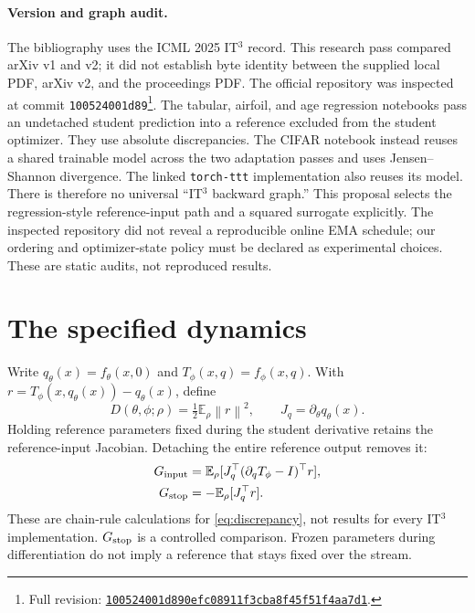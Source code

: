 \documentclass[11pt,a4paper]{article}
\newcommand{\E}{\mathbb{E}}
\newcommand{\norm}[1]{\left\lVert #1\right\rVert}
\begin{document}
\paragraph{Version and graph audit.}
The bibliography uses the ICML 2025 IT$^3$ record. This research pass compared
arXiv v1 and v2; it did not establish byte identity between the supplied
local PDF, arXiv v2, and the proceedings PDF. The official repository was
inspected at commit \texttt{100524001d89}\footnote{Full revision:
\href{https://github.com/nikitadurasov/ittt/tree/100524001d890efc08911f3cba8f45f51f4aa7d1}{\texttt{100524001d890efc08911f3cba8f45f51f4aa7d1}}.}.
The tabular, airfoil, and age regression notebooks pass an undetached student
prediction into a reference excluded from the student optimizer. They use
absolute discrepancies. The CIFAR notebook instead reuses a shared
trainable model across the two adaptation passes and uses Jensen--Shannon
divergence. The linked \texttt{torch-ttt} implementation also reuses its
model. There is therefore no universal ``IT$^3$ backward graph.'' This
proposal selects the regression-style reference-input path and a squared
surrogate explicitly. The inspected repository did not reveal a reproducible
online EMA schedule; our ordering and optimizer-state policy must be declared
as experimental choices. These are static audits, not reproduced results.

\section{The specified dynamics}
Write $q_\theta(x)=f_\theta(x,0)$ and $T_\phi(x,q)=f_\phi(x,q)$. With
$r=T_\phi(x,q_\theta(x))-q_\theta(x)$, define
\begin{equation}
 D(\theta,\phi;\rho)=\tfrac12\E_\rho\norm{r}^2,
 \qquad J_q=\partial_\theta q_\theta(x).
 \label{eq:discrepancy}
\end{equation}
Holding reference parameters fixed during the student derivative retains
the reference-input Jacobian. Detaching the entire reference output removes it:
\begin{align}
 G_{\rm input}&=\E_\rho[J_q^\top(\partial_qT_\phi-I)^\top r],
 \label{eq:input}\\
 G_{\rm stop}&=-\E_\rho[J_q^\top r].
 \label{eq:stop}
\end{align}
These are chain-rule calculations for \eqref{eq:discrepancy}, not results
for every IT$^3$ implementation. $G_{\rm stop}$ is a controlled comparison.
Frozen parameters during differentiation do not imply a reference that
stays fixed over the stream.
\end{document}
